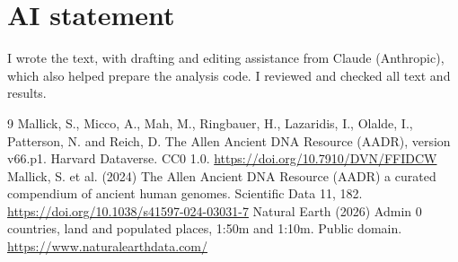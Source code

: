 \documentclass[11pt,a4paper]{article}
\begin{document}
\section*{AI statement}
I wrote the text, with drafting and editing assistance from Claude (Anthropic), which also helped prepare the analysis code. I reviewed and checked all text and results.

\begin{thebibliography}{9}
 Mallick, S., Micco, A., Mah, M., Ringbauer, H., Lazaridis, I., Olalde, I., Patterson, N. and Reich, D. The Allen Ancient DNA Resource (AADR), version v66.p1. Harvard Dataverse. CC0 1.0. \url{https://doi.org/10.7910/DVN/FFIDCW}
 Mallick, S. et al. (2024) The Allen Ancient DNA Resource (AADR) a curated compendium of ancient human genomes. Scientific Data 11, 182. \url{https://doi.org/10.1038/s41597-024-03031-7}
 Natural Earth (2026) Admin 0 countries, land and populated places, 1:50m and 1:10m. Public domain. \url{https://www.naturalearthdata.com/}
\end{thebibliography}
\end{document}
